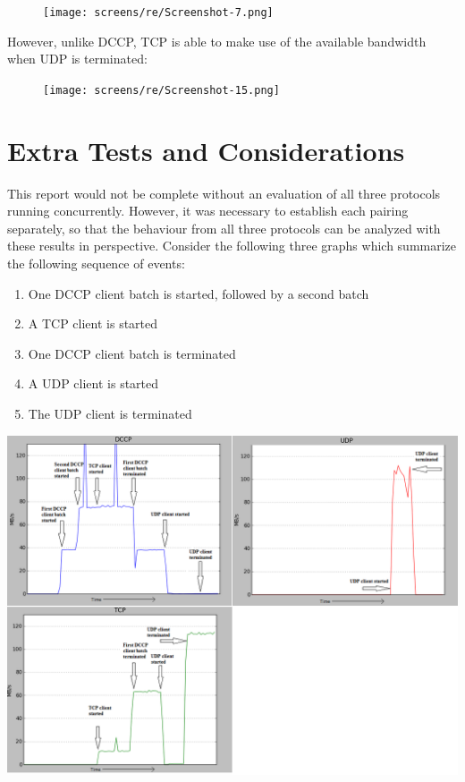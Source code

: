 \documentclass[10pt,a4paper]{article}
\begin{document}
\begin{figure}[!h]
\begin{center}
\hspace*{-65pt}
\texttt{[image: screens/re/Screenshot-7.png]}
\end{center}
\end{figure}

However, unlike DCCP, TCP is able to make use of the available
bandwidth when UDP is terminated:

\begin{figure}[!h]
\begin{center}
\hspace*{-65pt}
\texttt{[image: screens/re/Screenshot-15.png]}
\end{center}
\end{figure}


\section{Extra Tests and Considerations} %
This report would not be complete without an evaluation of all three protocols
running concurrently. However, it was necessary to establish each pairing
separately, so that  the behaviour from all
three protocols can be analyzed with these results in perspective. Consider the
following three graphs which summarize the following sequence of events:

\begin{enumerate}
 \item One DCCP client batch is started, followed by a second batch
 \item A TCP client is started
 \item One DCCP client batch is terminated
 \item A UDP client is started
 \item The UDP client is terminated
\end{enumerate}

\hspace*{-65pt}
\includegraphics[scale=.52]{screens/trio.png}
\end{document}
